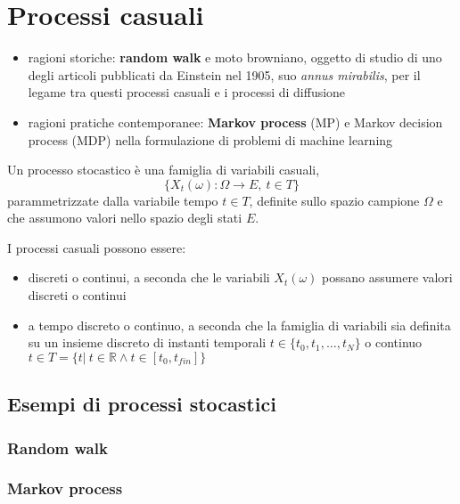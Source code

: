 \chapter{Processi casuali}
{\color{red}
\begin{itemize}
    \item ragioni storiche: \textbf{random walk} e moto browniano, oggetto di studio di uno degli articoli pubblicati da Einstein nel 1905, suo \textit{annus mirabilis}, per il legame tra questi processi casuali e i processi di diffusione
    \item ragioni pratiche contemporanee: \textbf{Markov process} (MP) e Markov decision process (MDP) nella formulazione di problemi di machine learning
\end{itemize}
}

\begin{definition} Un processo stocastico è una famiglia di variabili casuali,
    \begin{equation}
        \{ X_t(\omega): \Omega \rightarrow E, \ t \in T \}
    \end{equation}
    parammetrizzate dalla variabile tempo $t \in T$, definite sullo spazio campione $\Omega$ e che assumono valori nello spazio degli stati $E$.
\end{definition}
I processi casuali possono essere:
\begin{itemize}
    \item discreti o continui, a seconda che le variabili $X_t(\omega)$ possano assumere valori discreti o continui
    \item a tempo discreto o continuo, a seconda che la famiglia di variabili sia definita su un insieme discreto di instanti temporali $t \in \{t_0, t_1, \dots, t_N \}$ o continuo $t \in T = \{ t| \ t \in \mathbb{R} \land t \in [t_0, t_{fin}] \}$
\end{itemize}

\section{Esempi di processi stocastici}
\subsection{Random walk}
\subsection{Markov process}

